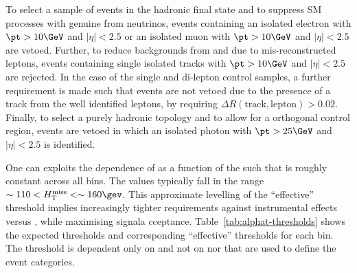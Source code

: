 To select a sample of events in the hadronic final state and to suppress SM processes with genuine \met from neutrinos, events
containing an isolated electron with $\pt > 10\GeV$ and $|\eta| < 2.5$ or an isolated muon with $\pt > 10\GeV$ and $|\eta| < 2.5$ are
vetoed. Further, to reduce backgrounds from \wj and \ttbar due to mis-reconstructed leptons, events containing single isolated tracks with $\pt > 10\GeV$ and $|\eta| < 2.5$ are rejected. In the case of the single and di-lepton control samples, a further
requirement is made such that events are not vetoed due to the presence of a track from the well identified leptons, by requiring
$\Delta R(\textrm{track},\textrm{lepton}) > 0.02$. Finally, to select a purely hadronic topology and to allow for a 
orthogonal control region, events are vetoed in which an isolated photon with $\pt > 25\GeV$ and $|\eta| < 2.5$ is identified.



One can exploits the dependence of  \alphat as a function of the \HT such that \mht is roughly constant across all \HT bins. 
The values typically fall in the range $\sim110 < \mht < \sim160\gev$. This approximate levelling of the ``effective'' \mht threshold implies
increasingly tighter requirements against instrumental effects versus \HT, while maximising signala cceptance. 
Table~\ref{tab:alphat-thresholds} shows the expected \alphat thresholds and corresponding ``effective'' \mht thresholds for each \HT bin. 
The \alphat threshold is dependent only on \HT and not on \njet nor \nb that are used to define the event categories.


